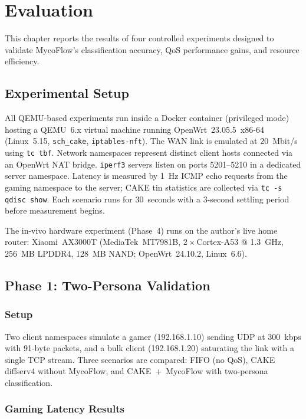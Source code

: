 
\chapter{Evaluation}\label{chapter:evaluation}

This chapter reports the results of four controlled experiments designed to validate MycoFlow's classification accuracy, QoS performance gains, and resource efficiency.

\section{Experimental Setup}

All QEMU-based experiments run inside a Docker container (privileged mode) hosting a QEMU~6.x virtual machine running OpenWrt~23.05.5~x86-64 (Linux~5.15, \texttt{sch\_cake}, \texttt{iptables-nft}). The WAN link is emulated at 20~Mbit/s using \texttt{tc tbf}. Network namespaces represent distinct client hosts connected via an OpenWrt NAT bridge. \texttt{iperf3} servers listen on ports 5201--5210 in a dedicated server namespace. Latency is measured by 1~Hz ICMP echo requests from the gaming namespace to the server; CAKE tin statistics are collected via \texttt{tc -s qdisc show}. Each scenario runs for 30~seconds with a 3-second settling period before measurement begins.

The in-vivo hardware experiment (Phase~4) runs on the author's live home router: Xiaomi~AX3000T (MediaTek~MT7981B, $2\times$Cortex-A53 @ 1.3~GHz, 256~MB LPDDR4, 128~MB NAND; OpenWrt~24.10.2, Linux~6.6).

\section{Phase 1: Two-Persona Validation}

\subsection{Setup}

Two client namespaces simulate a gamer (192.168.1.10) sending UDP at 300~kbps with 91-byte packets, and a bulk client (192.168.1.20) saturating the link with a single TCP stream. Three scenarios are compared: FIFO (no QoS), CAKE diffserv4 without MycoFlow, and CAKE~+~MycoFlow with two-persona classification.

\subsection{Gaming Latency Results}

